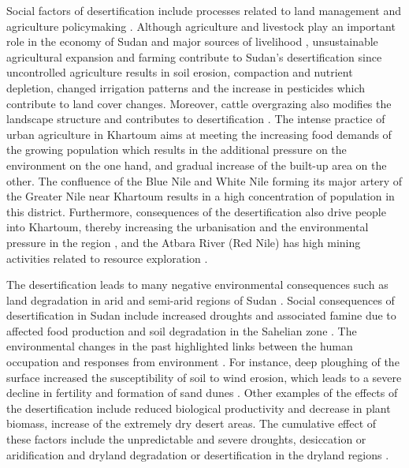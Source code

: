 \documentclass[jimaging,article,submit,pdftex,moreauthors]{Definitions/mdpi}
\begin{document}
Social factors of desertification include processes related to land management and agriculture policymaking \cite{KOBAYASHI2020257}. Although agriculture and livestock play an important role in the economy of Sudan and major sources of livelihood \cite{sulieman2010expansion}, unsustainable agricultural expansion and farming contribute to Sudan's desertification \cite{Ibrahim} since uncontrolled agriculture results in soil erosion, compaction and nutrient depletion, changed irrigation patterns \cite{AHMED2020106064} and the increase in pesticides \cite{Nesser} which contribute to land cover changes. Moreover, cattle overgrazing also modifies the landscape structure and contributes to desertification \cite{Ahmed,Sulieman,Akhtar}. The intense practice of urban agriculture in Khartoum aims at meeting the increasing food demands of the growing population \cite{SCHUMACHER2009399} which results in the additional pressure on the environment on the one hand, and gradual increase of the built-up area on the other. The confluence of the Blue Nile and White Nile forming its major artery of the Greater Nile near Khartoum results in a high concentration of population in this district. Furthermore, consequences of the desertification also drive people into Khartoum, thereby increasing the urbanisation and the environmental pressure in the region \cite{Babiker1982,Mohammed}, and the Atbara River (Red Nile) has high mining activities related to resource exploration \cite{SASMAZ2020106539}. 

The desertification leads to many negative environmental consequences such as land degradation in arid and semi-arid regions of Sudan \cite{Khiry,ELNASHAR2022152925}. Social consequences of desertification in Sudan include increased droughts and associated famine due to affected food production and soil degradation in the Sahelian zone \cite{Subramaniam}. The environmental changes in the past highlighted links between the human occupation and responses from environment \cite{HONEGGER2015141}. For instance, deep ploughing of the surface increased the susceptibility of soil to wind erosion, which leads to a severe decline in fertility and formation of sand dunes \cite{Abdi}. Other examples of the effects of the desertification include reduced biological productivity \cite{KHALIFA2018790,Jahelnabi} and decrease in plant biomass, increase of the extremely dry desert areas. The cumulative effect of these factors include the unpredictable and severe droughts, desiccation or aridification and dryland degradation or desertification in the dryland regions \cite{Darkoh}. 
\end{document}
